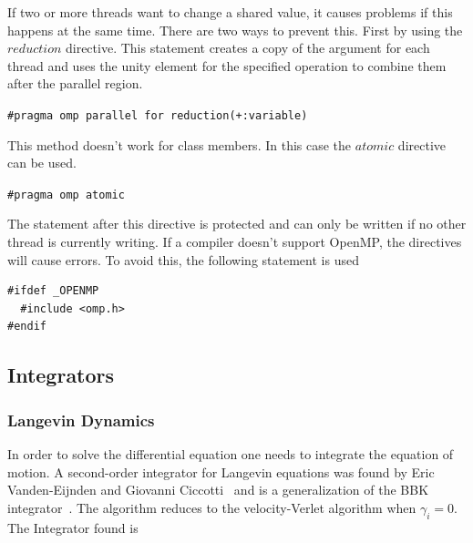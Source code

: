 \documentclass[a4paper]{article}
\begin{document}
If two or more threads want to change a shared value, it causes problems if this happens at the same time. There are two ways to prevent this. First by using the $reduction$ directive. This statement creates a copy of the argument for each thread and uses the unity element for the specified operation to combine them after the parallel region. 

\begin{center}
\texttt{\#pragma omp parallel for reduction(+:variable)}
\end{center}

This method doesn't work for class members. In this case the $atomic$ directive can be used. 

\begin{center}
\texttt{\#pragma omp atomic}
\end{center}

The statement after this directive is protected and can only be written if no other thread is currently writing.
If a compiler doesn't support OpenMP, the directives will cause errors. To avoid this, the following statement is used

\begin{lstlisting}[caption={To avoid error messages if OpenMP is not installed}, label={c++:openmp_protection}]
#ifdef _OPENMP
  #include <omp.h>
#endif
\end{lstlisting}

\subsection{Integrators}

\subsubsection{Langevin Dynamics}


In order to solve the differential equation one needs to integrate the equation of motion. A second-order integrator for Langevin equations was found by Eric Vanden-Eijnden and Giovanni Ciccotti~\cite{EricVanden-Eijnden2006} and is a generalization of the BBK integrator~\cite{BrungerA.1984}. The algorithm reduces to the velocity-Verlet algorithm when $\gamma_i = 0$. The Integrator found is
\end{document}
